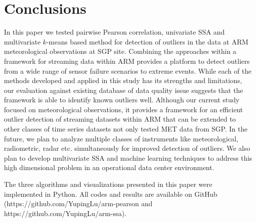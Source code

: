\section{Conclusions}
In this paper we tested pairwise Pearson correlation,
univariate SSA and multivariate $k$-means based method for detection of
outliers in the data at ARM meteorological observations at SGP site. 
Combining the approaches within a framework for
streaming data within ARM provides a platform to detect outliers
from a wide range of sensor failure scenarios to extreme events.
While each of the methods developed and applied in this study has its
strengths and limitations, our evaluation against existing database of
data quality issue suggests that the framework is able to identify known
outliers well. Although our current study focused on
meteorological observations, it provides a framework for an efficient
outlier detection of streaming datasets within ARM that can be extended to
other classes of time series datasets not only tested MET data from SGP. 
In the future, we plan to analyze multiple
classes of instruments like meteorological, radiometric, radar etc.
simultaneously for improved detection of outliers. We also plan to
develop multivariate SSA \cite{rodrigues2018benefits} and machine learning 
techniques to address this high dimensional problem in an operational 
data center environment.

The three algorithms and visualizations presented in this paper were 
implemented in Python. All codes and results are available on GitHub 
(https://github.com/YupingLu/arm-pearson and https://github.com/YupingLu/arm-ssa). 
